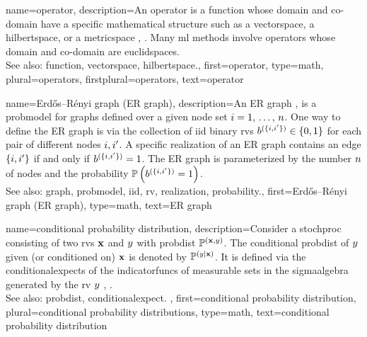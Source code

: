 {name={operator}, 
	description={An operator is a \gls{function} 
		whose \gls{domain} and \gls{co-domain} have a specific 
		mathematical structure such as a \gls{vectorspace}, a \gls{hilbertspace},
		or a \gls{metricspace} \cite{Bauschke:2017}, \cite{DunfordSchwartz1988}. 
		Many \gls{ml} methods involve operators whose \gls{domain} and \gls{co-domain} 
		are \glspl{euclidspace}.
							\\ 
		See also: \gls{function}, \gls{vectorspace}, \gls{hilbertspace}.},
	first={operator},
	type=math, 
	plural={operators},
	firstplural={operators},
	text={operator}
}

{name={Erd\H{o}s–R\'enyi graph (ER graph)},
	description={An ER \gls{graph} \cite{erdds1959random}, \cite{gilbert1959random} 
            	is a \gls{probmodel} for \glspl{graph} defined over a given node set $i=1, \,\ldots, \,n$. 
            	One way to define the ER \gls{graph} is via the collection of \gls{iid} binary 
            	\glspl{rv} $b^{(\{i,i'\})} \in \{0,1\}$
		for each pair of different nodes $i, i'$. A specific \gls{realization}  
		of an ER \gls{graph} contains an edge $\{i,i'\}$ if and only if 
		$b^{(\{i,i'\})}=1$. The ER \gls{graph} is parameterized by the 
		number $n$ of nodes and the \gls{probability} $\mathbb{P}\left(b^{(\{i,i'\})}=1\right)$.	
		\\
		See also: \gls{graph}, \gls{probmodel}, \gls{iid}, \gls{rv}, \gls{realization}, \gls{probability}.},
	first={Erd\H{o}s–R\'enyi graph (ER graph)},
	type=math,
	text={ER graph}
}

{name={conditional probability distribution}, 
	description={Consider 
     		a \gls{stochproc} consisting of two \glspl{rv} ${\bf x}$ and $y$ 
    		with \gls{probdist} $\mathbb{P}^{({\bf x},y)}$. The conditional 
    		\gls{probdist} of $y$ given (or conditioned on) ${\bf x}$ is 
    		denoted by $\mathbb{P}^{(y\mid{\bf x})}$. It is defined via the 
    		\glspl{conditionalexpect} of the \glspl{indicatorfunc} of  
    		\gls{measurable} sets in the \gls{sigmaalgebra} generated by 
    		the \gls{rv} $y$ \cite[Sec. 34]{BillingsleyProbMeasure}, \cite{KallenbergBook}.
		\\
		See also: \gls{probdist}, \gls{conditionalexpect}. },
  	first={conditional probability distribution}, 
  	plural={conditional probability distributions},
  	type=math, 
  	text={conditional probability distribution}
}

